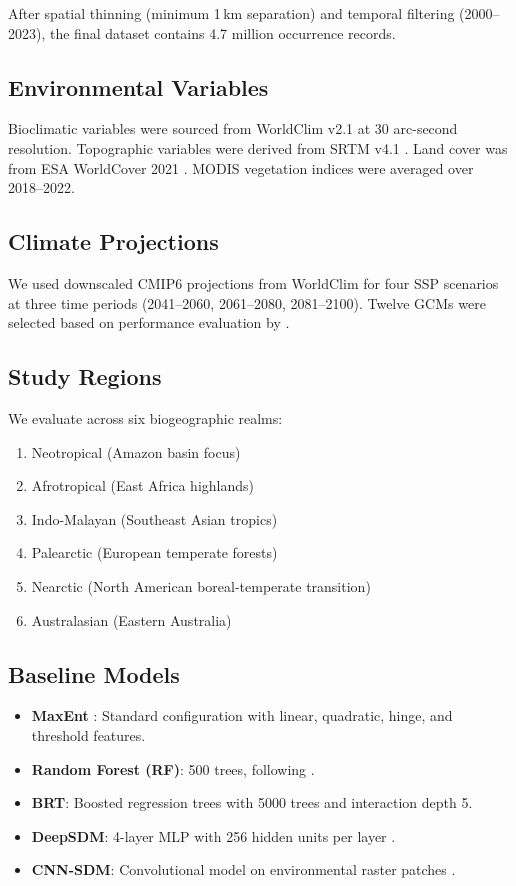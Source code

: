 \documentclass[11pt,a4paper]{article}
\begin{document}
After spatial thinning (minimum 1\,km separation) and temporal filtering
(2000--2023), the final dataset contains 4.7 million occurrence records.

\subsection{Environmental Variables}

Bioclimatic variables were sourced from WorldClim v2.1
\citep{fick2017worldclim} at 30 arc-second resolution. Topographic
variables were derived from SRTM v4.1 \citep{jarvis2008srtm}. Land cover
was from ESA WorldCover 2021 \citep{zanaga2022esa}. MODIS vegetation
indices were averaged over 2018--2022.

\subsection{Climate Projections}

We used downscaled CMIP6 projections from WorldClim
\citep{fick2017worldclim} for four SSP scenarios at three time periods
(2041--2060, 2061--2080, 2081--2100). Twelve GCMs were selected based
on performance evaluation by \citet{arias2021climate}.

\subsection{Study Regions}

We evaluate across six biogeographic realms:
\begin{enumerate}
  \item Neotropical (Amazon basin focus)
  \item Afrotropical (East Africa highlands)
  \item Indo-Malayan (Southeast Asian tropics)
  \item Palearctic (European temperate forests)
  \item Nearctic (North American boreal-temperate transition)
  \item Australasian (Eastern Australia)
\end{enumerate}

\subsection{Baseline Models}

\begin{itemize}
  \item \textbf{MaxEnt} \citep{phillips2006maximum}: Standard
    configuration with linear, quadratic, hinge, and threshold features.
  \item \textbf{Random Forest (RF)}: 500 trees, following
    \citet{cutler2007random}.
  \item \textbf{BRT}: Boosted regression trees \citep{elith2008working}
    with 5000 trees and interaction depth 5.
  \item \textbf{DeepSDM}: 4-layer MLP with 256 hidden units per layer
    \citep{botella2018deep}.
  \item \textbf{CNN-SDM}: Convolutional model on environmental raster
    patches \citep{deneu2021convolutional}.
\end{itemize}
\end{document}
